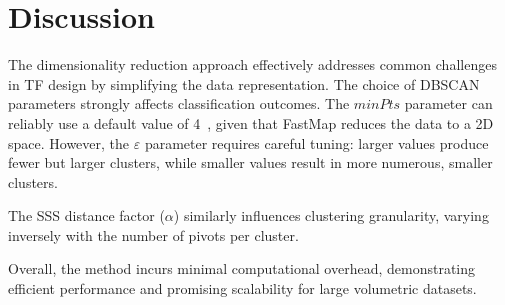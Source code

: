 \section{Discussion}
\label{sect:discussion}

The dimensionality reduction approach effectively addresses common challenges in TF design by simplifying the data representation. The choice of DBSCAN parameters strongly affects classification outcomes. The $minPts$ parameter can reliably use a default value of 4~\cite{ester1996}, given that FastMap reduces the data to a 2D space. However, the $\varepsilon$ parameter requires careful tuning: larger values produce fewer but larger clusters, while smaller values result in more numerous, smaller clusters.

The SSS distance factor ($\alpha$) similarly influences clustering granularity, varying inversely with the number of pivots per cluster.

Overall, the method incurs minimal computational overhead, demonstrating efficient performance and promising scalability for large volumetric datasets.
